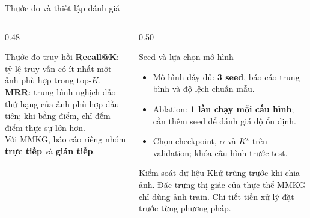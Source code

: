 \documentclass[aspectratio=169,10pt]{beamer}
\begin{document}
\begin{frame}{Thước đo và thiết lập đánh giá}
  \begin{columns}[t]
    \begin{column}{0.48\textwidth}
      \begin{block}{Thước đo truy hồi}\footnotesize
        \textbf{Recall@K}: tỷ lệ truy vấn có ít nhất một ảnh phù hợp trong top-$K$.\\[0.15cm]
        \textbf{MRR}: trung bình nghịch đảo thứ hạng của ảnh phù hợp đầu tiên; khi bằng điểm, chỉ đếm điểm thực sự lớn hơn.\\[0.15cm]
        Với MMKG, báo cáo riêng nhóm \textbf{trực tiếp} và \textbf{gián tiếp}.
      \end{block}
    \end{column}
    \begin{column}{0.50\textwidth}
      \begin{block}{Seed và lựa chọn mô hình}\footnotesize
        \begin{itemize}
          \item Mô hình đầy đủ: \textbf{3 seed}, báo cáo trung bình và độ lệch chuẩn mẫu.
          \item Ablation: \textbf{1 lần chạy mỗi cấu hình}; cần thêm seed để đánh giá độ ổn định.
          \item Chọn checkpoint, $\alpha$ và $K^\star$ trên validation; khóa cấu hình trước test.
        \end{itemize}
      \end{block}
      \begin{exampleblock}{Kiểm soát dữ liệu}\footnotesize
        Khử trùng trước khi chia ảnh. Đặc trưng thị giác của thực thể MMKG chỉ dùng ảnh train. Chi tiết tiền xử lý đặt trước từng phương pháp.
      \end{exampleblock}
    \end{column}
  \end{columns}
\end{frame}
\end{document}
